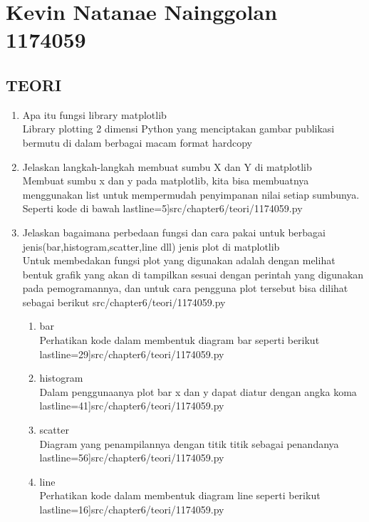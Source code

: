 \section {Kevin Natanae Nainggolan 1174059}
	\subsection {TEORI}
	\begin {enumerate}
		\item  Apa itu fungsi library matplotlib
			\\Library plotting 2 dimensi Python yang menciptakan gambar publikasi bermutu di dalam berbagai macam format hardcopy
		\item Jelaskan langkah-langkah membuat sumbu X dan Y di matplotlib
			\\ Membuat sumbu x dan y pada matplotlib, kita bisa membuatnya menggunakan list untuk mempermudah penyimpanan nilai setiap sumbunya. Seperti kode di bawah
			 lastline=5]{src/chapter6/teori/1174059.py}
		\item Jelaskan bagaimana perbedaan fungsi dan cara pakai untuk berbagai jenis(bar,histogram,scatter,line dll) jenis plot di matplotlib
			\\Untuk membedakan fungsi plot yang digunakan adalah dengan melihat bentuk grafik yang akan di tampilkan sesuai dengan perintah yang digunakan pada pemogramannya, dan untuk cara pengguna plot tersebut bisa dilihat sebagai berikut
			{src/chapter6/teori/1174059.py}
				\begin {enumerate}
					\item bar 
					\\Perhatikan kode dalam membentuk diagram bar seperti berikut
						 lastline=29]{src/chapter6/teori/1174059.py}
					\item histogram
					\\Dalam penggunaanya plot bar x dan y dapat diatur dengan angka koma
						 lastline=41]{src/chapter6/teori/1174059.py}
					\item scatter
					\\Diagram yang penampilannya dengan titik titik sebagai penandanya
						 lastline=56]{src/chapter6/teori/1174059.py}
					\item line
					\\Perhatikan kode dalam membentuk diagram line seperti berikut
						 lastline=16]{src/chapter6/teori/1174059.py}

\end{enumerate}
\end{enumerate}
